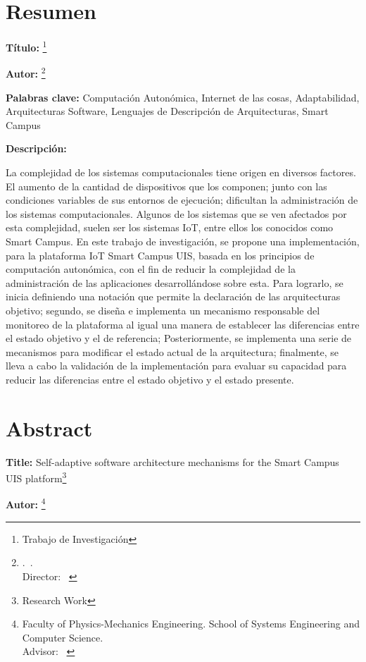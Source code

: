\section*{Resumen}

\textbf{Título:} \tit\footnote{Trabajo de Investigación}

\textbf{Autor:} \nam\footnote{\fac.\ \esc.\\ Director: \tdir\ \dir}

\textbf{Palabras clave:} { Computación Autonómica, Internet de las cosas, Adaptabilidad, \\Arquitecturas Software, Lenguajes de Descripción de Arquitecturas, Smart Campus }

\textbf{Descripción:}

La complejidad de los sistemas computacionales tiene origen en diversos factores. El aumento de la cantidad de dispositivos que los componen; junto con las condiciones variables de sus entornos de ejecución; dificultan la administración de los sistemas computacionales. Algunos de los sistemas que se ven afectados por esta complejidad, suelen ser los sistemas IoT, entre ellos los conocidos como Smart Campus. En este trabajo de investigación, se propone una implementación, para la plataforma IoT Smart Campus UIS, basada en los principios de computación autonómica, con el fin de reducir la complejidad de la administración de las aplicaciones desarrollándose sobre esta. Para lograrlo, se inicia definiendo una notación que permite la declaración de las arquitecturas objetivo; segundo, se diseña e implementa un mecanismo responsable del monitoreo de la plataforma al igual una manera de establecer las diferencias entre el estado objetivo y el de referencia; Posteriormente, se implementa una serie de mecanismos para modificar el estado actual de la arquitectura; finalmente, se lleva a cabo la validación de la implementación para evaluar su capacidad para reducir las diferencias entre el estado objetivo y el estado presente.

\newpage

\section*{Abstract}

\textbf{Title:} {Self-adaptive software architecture mechanisms for the Smart Campus\\UIS platform}\footnote{Research Work}

\textbf{Autor:} \nam\footnote{Faculty of Physics-Mechanics Engineering. School of Systems Engineering and Computer
	Science.\\ Advisor: \tdir\ \dir }

